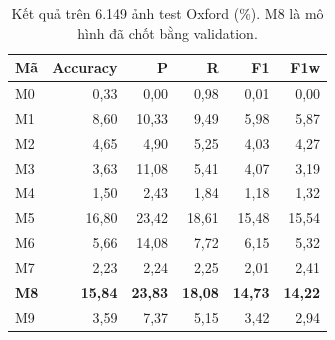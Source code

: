 \begin{table}[H]\centering\small
\caption{Kết quả trên 6.149 ảnh test Oxford (\%). M8 là mô hình đã chốt bằng validation.}
\begin{tabular}{lrrrrr}\toprule
Mã & Accuracy & P & R & F1 & F1w\\\midrule
M0 & 0,33 & 0,00 & 0,98 & 0,01 & 0,00\\
M1 & 8,60 & 10,33 & 9,49 & 5,98 & 5,87\\
M2 & 4,65 & 4,90 & 5,25 & 4,03 & 4,27\\
M3 & 3,63 & 11,08 & 5,41 & 4,07 & 3,19\\
M4 & 1,50 & 2,43 & 1,84 & 1,18 & 1,32\\
M5 & 16,80 & 23,42 & 18,61 & 15,48 & 15,54\\
M6 & 5,66 & 14,08 & 7,72 & 6,15 & 5,32\\
M7 & 2,23 & 2,24 & 2,25 & 2,01 & 2,41\\
\textbf{M8} & \textbf{15,84} & \textbf{23,83} & \textbf{18,08} & \textbf{14,73} & \textbf{14,22}\\
M9 & 3,59 & 7,37 & 5,15 & 3,42 & 2,94\\
\bottomrule\end{tabular}
\end{table}
